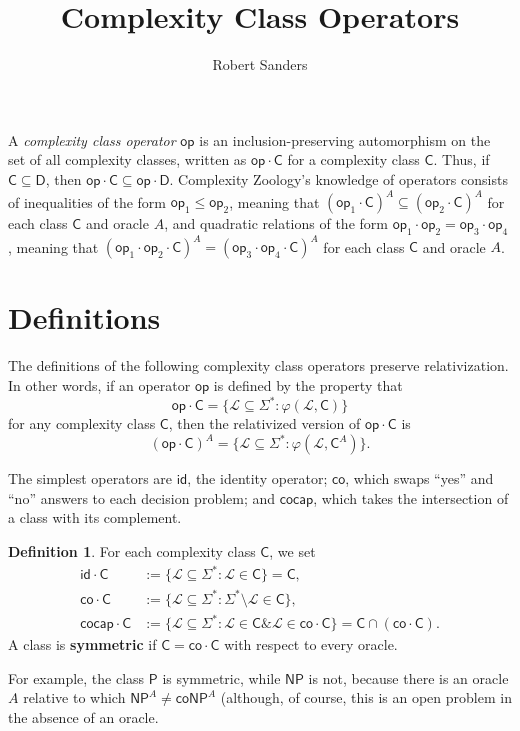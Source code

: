 \documentclass[12pt]{amsart}
\title{Complexity Class Operators}
\date{}
\author{Robert Sanders}
\theoremstyle{definition}
\newtheorem*{definition}{Definition}
\theoremstyle{remark}
\newcommand{\cL}{\mathcal{L}}
\newcommand{\sC}{\mathsf{C}}
\newcommand{\co}{\mathsf{co}}
\newcommand{\cocap}{\mathsf{cocap}}
\newcommand{\NP}{\mathsf{NP}}
\newcommand{\sP}{\mathsf{P}}
\newcommand{\msf}[1]{\mathsf{#1}}
\newcommand{\id}{\msf{id}}
\newcommand{\AND}{\mathbin{\&}}
\newcommand{\op}{\msf{op}}
\begin{document}
\maketitle

A \textit{complexity class operator} $\op$ is an inclusion-preserving
automorphism on the set of all complexity classes, written as $\op\cdot\sC$ for
a complexity class $\sC$. Thus, if $\sC\subseteq\msf{D}$, then
$\op\cdot\sC\subseteq\op\cdot\msf{D}$. Complexity Zoology's knowledge of
operators consists of inequalities of the form $\op_1\leq\op_2$, meaning that
$(\op_1\cdot\sC)^A\subseteq(\op_2\cdot\sC)^A$ for each class $\sC$ and oracle
$A$, and quadratic relations of the form $\op_1\cdot\op_2=\op_3\cdot\op_4$,
meaning that $(\op_1\cdot\op_2\cdot\sC)^A=(\op_3\cdot\op_4\cdot\sC)^A$ for each
class $\sC$ and oracle $A$.

\section{Definitions}

The definitions of the following complexity
class operators preserve relativization. In other words, if an operator
$\msf{op}$ is defined by the property that
\[
  \msf{op}\cdot\sC=\{\cL\subseteq\Sigma^*:\varphi(\cL,\sC)\}
\]
for any complexity class $\sC$, then the relativized version of
$\msf{op}\cdot\sC$ is
\[
  (\msf{op}\cdot\sC)^A=\{\cL\subseteq\Sigma^*:\varphi(\cL,\sC^A)\}.
\]

The simplest operators are $\id$, the identity operator; $\co$, which swaps
``yes'' and ``no'' answers to each decision problem; and $\cocap$, which takes
the intersection of a class with its complement.

\begin{definition} For each complexity class $\sC$, we set
\begin{align*}
  \id\cdot\sC&:=\{\cL\subseteq\Sigma^*:\cL\in\sC\}=\sC, \\
  \co\cdot\sC&:=\{\cL\subseteq\Sigma^*:\Sigma^*\setminus\cL\in\sC\}, \\
  \cocap\cdot\sC&:=\{\cL\subseteq\Sigma^*:\cL\in\sC\AND\cL\in\co\cdot\sC\}=
                  \sC\cap(\co\cdot\sC).
\end{align*}
A class is \textbf{symmetric} if $\sC=\co\cdot\sC$ with respect to every oracle.
\end{definition}
For example, the class $\sP$ is symmetric, while $\NP$ is not, because there is
an oracle $A$ relative to which $\NP^A\neq\co\NP^A$ (although, of course, this
is an open problem in the absence of an oracle.
\end{document}
